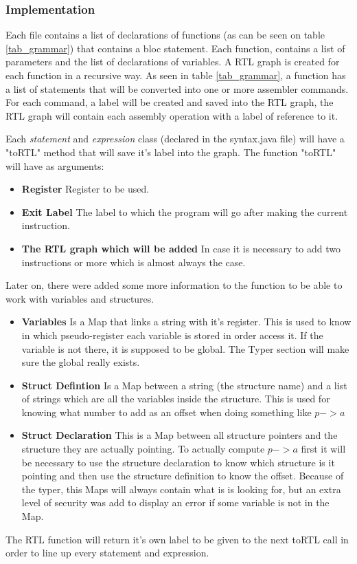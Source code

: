 \documentclass[conference]{IEEEtran}
\begin{document}
\subsubsection{Implementation}
Each file contains a list of declarations of functions (as can be seen on table \ref{tab_grammar}) that contains a bloc statement. Each function, contains a list of parameters and the list of declarations of variables.
A RTL graph is created for each function in a recursive way. As seen in table \ref{tab_grammar}, a function has a list of statements that will be converted into one or more assembler commands. For each command, a label will be created and saved into the RTL graph, the RTL graph will contain each assembly operation with a label of reference to it. 

Each \textit{statement} and \textit{expression} class (declared in the syntax.java file) will have a "toRTL" method that will save it's label into the graph. The function "toRTL" will have as arguments:
\begin{itemize}
	\item \textbf{Register} Register to be used.
	\item \textbf{Exit Label} The label to which the program will go after making the current instruction.
	\item \textbf{The RTL graph which will be added} In case it is necessary to add two instructions or more which is almost always the case.
\end{itemize}
Later on, there were added some more information to the function to be able to work with variables and structures.
\begin{itemize}
	\item \textbf{Variables} Is a Map that links a string with it's register. This is used to know in which pseudo-register each variable is stored in order access it. If the variable is not there, it is supposed to be global. The Typer section will make sure the global really exists.
	\item \textbf{Struct Defintion} Is a Map between a string (the structure name) and a list of strings which are all the variables inside the structure. This is used for knowing what number to add as an offset when doing something like $p->a$
	\item \textbf{Struct Declaration} This is a Map between all structure pointers and the structure they are actually pointing. To actually compute $p->a$ first it will be necessary to use the structure declaration to know which structure is it pointing and then use the structure definition to know the offset. Because of the typer, this Maps will always contain what is is looking for, but an extra level of security was add to display an error if some variable is not in the Map.
\end{itemize}
The RTL function will return it's own label to be given to the next toRTL call in order to line up every statement and expression.
\end{document}
